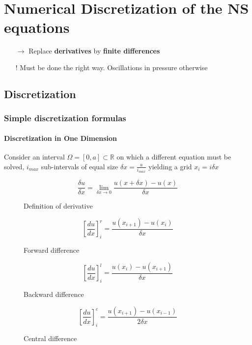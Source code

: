 \section{Numerical Discretization of the NS equations}
\begin{itemize}
	\item[$\rightarrow$] Replace \textbf{derivatives} by \textbf{finite differences}
	\item[!] Must be done the right way. Oscillations in pressure otherwise
\end{itemize}

\subsection{Discretization}

\subsubsection{Simple discretization formulas}

\paragraph{Discretization in One Dimension}
Consider an interval $\Omega = [0,a] \subset \mathds{R}$ on which a different equation must be solved, $i_{max}$ sub-intervals of equal size $\delta x = \frac{a}{i_{max}}$ yielding a grid $x_i = i \delta x$
\begin{figure}[H]
	\centering
	\[ \frac{\delta u}{\delta x} = \lim\limits_{\delta x \rightarrow 0} \frac{u(x + \delta x) - u(x)}{\delta x}\]
    \renewcommand{\thefigure}{3.1}
	\caption{Definition of derivative}
	\label{fig:deriv-def}
\end{figure}

\begin{figure}[H]
	\centering
	\[ \left[\frac{d u}{d x}\right]^r_i = \frac{u(x_{i+1}) - u(x_i)}{\delta x}\]
    \renewcommand{\thefigure}{3.2}
	\caption{Forward difference}
	\label{fig:deriv-forward}
\end{figure}

\begin{figure}[H]
	\centering
	\[ \left[\frac{d u}{d x}\right]^l_i = \frac{u(x_i) - u(x_{i+1})}{\delta x}\]
    \renewcommand{\thefigure}{3.3}
	\caption{Backward difference}
	\label{fig:deriv-backward}
\end{figure}

\begin{figure}[H]
	\centering
	\[ \left[\frac{d u}{d x}\right]^c_i = \frac{u(x_{i+1}) - u(x_{i-1})}{2 \delta x}\]
    \renewcommand{\thefigure}{3.4}
	\caption{Central difference}
	\label{fig:deriv-central}
\end{figure}

